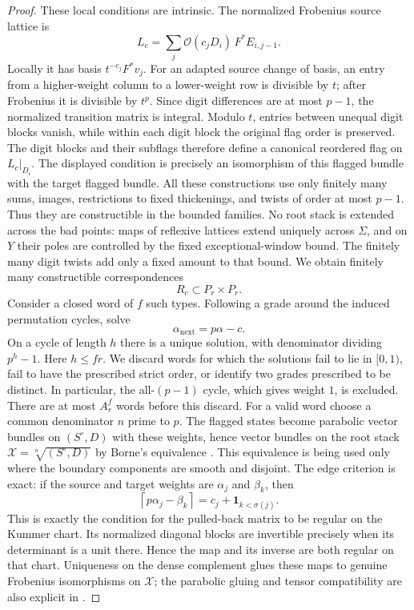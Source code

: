 \begin{proof}
These local conditions are intrinsic. The normalized Frobenius source lattice is
\[L_c=\sum_j\mathcal O(c_jD_i)\,F^*E_{i,j-1}.\]
Locally it has basis $t^{-c_j}F^*v_j$. For an adapted source change of basis, an entry from a higher-weight column to a lower-weight row is divisible by $t$; after Frobenius it is divisible by $t^p$. Since digit differences are at most $p-1$, the normalized transition matrix is integral. Modulo $t$, entries between unequal digit blocks vanish, while within each digit block the original flag order is preserved. The digit blocks and their subflags therefore define a canonical reordered flag on $L_c|_{D_i}$. The displayed condition is precisely an isomorphism of this flagged bundle with the target flagged bundle.
All these constructions use only finitely many sums, images, restrictions to fixed thickenings, and twists of order at most $p-1$. Thus they are constructible in the bounded families. No root stack is extended across the bad points: maps of reflexive lattices extend uniquely across $\Sigma$, and on $Y$ their poles are controlled by the fixed exceptional-window bound. The finitely many digit twists add only a fixed amount to that bound. We obtain finitely many constructible correspondences
\[R_c\subset P_r\times P_r.\]
Consider a closed word of $f$ such types. Following a grade around the induced permutation cycles, solve
\[\alpha_{\mathrm{next}}=p\alpha-c.\]
On a cycle of length $h$ there is a unique solution, with denominator dividing $p^h-1$. Here $h\le fr$. We discard words for which the solutions fail to lie in $[0,1)$, fail to have the prescribed strict order, or identify two grades prescribed to be distinct. In particular, the all-$(p-1)$ cycle, which gives weight $1$, is excluded. There are at most $A_r^f$ words before this discard.
For a valid word choose a common denominator $n$ prime to $p$. The flagged states become parabolic vector bundles on $(S^\circ,D)$ with these weights, hence vector bundles on the root stack $\mathcal X=\sqrt[n]{(S^\circ,D)}$ by Borne's equivalence \citep[Theorem~4, p.~12, with proof through p.~16]{Borne2007D}. This equivalence is being used only where the boundary components are smooth and disjoint. The edge criterion is exact: if the source and target weights are $\alpha_j$ and $\beta_k$, then
\[\left\lceil p\alpha_j-\beta_k\right\rceil=c_j+\mathbf1_{k<\sigma(j)}.\]
This is exactly the condition for the pulled-back matrix to be regular on the Kummer chart. Its normalized diagonal blocks are invertible precisely when its determinant is a unit there. Hence the map and its inverse are both regular on that chart. Uniqueness on the dense complement glues these maps to genuine Frobenius isomorphisms on $\mathcal X$; the parabolic gluing and tensor compatibility are also explicit in \citet[Theorem~6.1, pp.~33--36]{BorneVistoli2012D}.

\end{proof}
